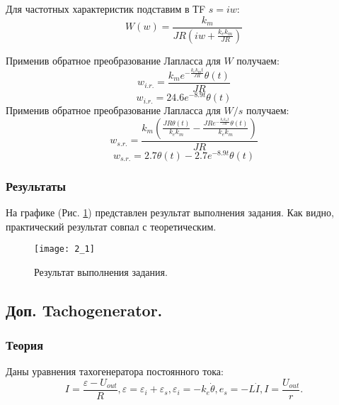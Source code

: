 \documentclass[16pt]{article}
\begin{document}
Для частотных характеристик подставим в ТF \(s = iw\):
\[
    W(w) = \frac{k_{m}}{J R \left(iw + \frac{k_{e} k_{m}}{J R}\right)}
\]

Применив обратное преобразование Лапласса для \(W\) получаем:
\[w_{i.r.} = \frac{k_{m} e^{- \frac{k_{e} k_{m} t}{J R}} \theta\left(t\right)}{J R}\]
\[w_{i.r.} = 24.6 e^{- 8.9 t} \theta\left(t\right)\]
Применив обратное преобразование Лапласса для \(W / s\) получаем:
\[w_{s.r.} = \frac{k_{m} \left(\frac{J R \theta\left(t\right)}{k_{e} k_{m}} - \frac{J R e^{- \frac{k_{e} k_{m} t}{J R}} \theta\left(t\right)}{k_{e} k_{m}}\right)}{J R}\]
\[w_{s.r.} = 2.7 \theta\left(t\right) - 2.7 e^{- 8.9 t} \theta\left(t\right)\]
\subsubsection{Результаты}
На графике (Рис. \ref*{fig:fig3}) представлен результат выполнения задания. Как видно, практический результат совпал с теоретическим.
\begin{figure}[h!]
    \centering
    \texttt{[image: 2\_1]}
    \caption{Результат выполнения задания.}
    \label{fig:fig3}
\end{figure}


\newpage
\subsection{ Доп. Tachogenerator.}

\subsubsection{Теория}
Даны уравнения тахогенератора постоянного тока:
\[I = \frac{\varepsilon - U_{out}}{R}, \varepsilon = \varepsilon_i + \varepsilon_s, \varepsilon_i = -k_e\dot{\theta}, e_s = -L\dot{I}, I = \frac{U_{out}}{r}.\]
\end{document}
